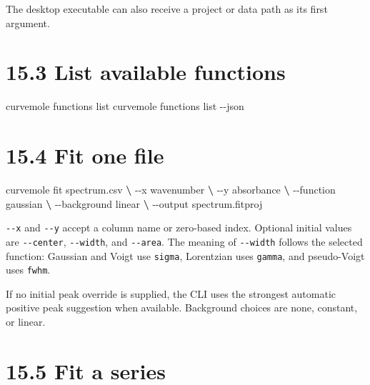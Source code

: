 \documentclass[
  10pt,
  a4paper,
  oneside]{scrreprt}
\newenvironment{Shaded}{}{}
\newcommand{\ExtensionTok}[1]{#1}
\newcommand{\KeywordTok}[1]{\textcolor[rgb]{0.00,0.44,0.13}{\textbf{#1}}}
\newcommand{\NormalTok}[1]{#1}
\begin{document}
The desktop executable can also receive a project or data path as its
first argument.

\hypertarget{list-available-functions}{%
\section{15.3 List available functions}\label{list-available-functions}}

\begin{Shaded}
\begin{Highlighting}[]
\ExtensionTok{curvemole}\NormalTok{ functions list}
\ExtensionTok{curvemole}\NormalTok{ functions list {-}{-}json}
\end{Highlighting}
\end{Shaded}

\hypertarget{fit-one-file}{%
\section{15.4 Fit one file}\label{fit-one-file}}

\begin{Shaded}
\begin{Highlighting}[]
\ExtensionTok{curvemole}\NormalTok{ fit spectrum.csv }\KeywordTok{\textbackslash{}}
  \ExtensionTok{{-}{-}x}\NormalTok{ wavenumber }\KeywordTok{\textbackslash{}}
  \ExtensionTok{{-}{-}y}\NormalTok{ absorbance }\KeywordTok{\textbackslash{}}
  \ExtensionTok{{-}{-}function}\NormalTok{ gaussian }\KeywordTok{\textbackslash{}}
  \ExtensionTok{{-}{-}background}\NormalTok{ linear }\KeywordTok{\textbackslash{}}
  \ExtensionTok{{-}{-}output}\NormalTok{ spectrum.fitproj}
\end{Highlighting}
\end{Shaded}

\texttt{-\/-x} and \texttt{-\/-y} accept a column name or zero-based
index. Optional initial values are \texttt{-\/-center},
\texttt{-\/-width}, and \texttt{-\/-area}. The meaning of
\texttt{-\/-width} follows the selected function: Gaussian and Voigt use
\texttt{sigma}, Lorentzian uses \texttt{gamma}, and pseudo-Voigt uses
\texttt{fwhm}.

If no initial peak override is supplied, the CLI uses the strongest
automatic positive peak suggestion when available. Background choices
are none, constant, or linear.

\hypertarget{fit-a-series}{%
\section{15.5 Fit a series}\label{fit-a-series}}
\end{document}

